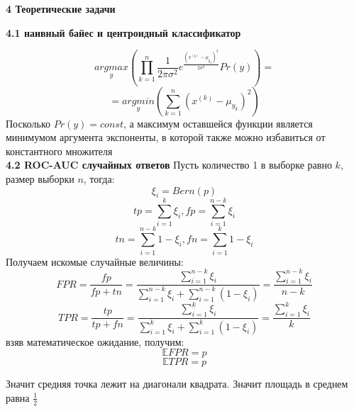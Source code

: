 \documentclass[11pt,a4paper]{article}
\begin{document}
\begin{center}
\Huge {
\noindent
\textbf{4 Теоретические задачи}
}
\end{center}
\Large {
\textbf {4.1 наивный байес и центроидный классификатор}
}

$$ \underset{y}{argmax} (\prod_{k=1}^{n} \frac{1}{2\pi \sigma^2}e^{\frac{(x^{(k)} - \mu_{y_k})^2}{2 \sigma^2}}  Pr(y)) = $$
$$=\underset{y}{argmin} (\sum_{k=1}^{n} (x^{(k)} - \mu_{y_k})^2) $$
Посколько $Pr(y) = const$,
а максимум оставшейся функции является минимумом аргумента экспоненты, в которой также можно избавиться от константного множителя
\\
\Large{
\textbf {4.2 ROC-AUC случайных ответов}
}
Пусть количество 1 в выборке равно $k$, размер выборки $n$, тогда:
\\
$$ \xi_i = Bern(p) $$
$$ tp = \sum_{i=1}^{k} \xi_i,  fp = \sum_{i=1}^{n - k} \xi_i$$
$$ tn = \sum_{i=1}^{n - k} 1- \xi_i,  fn = \sum_{i=1}^{k} 1 - \xi_i$$
Получаем искомые случайные величины:
$$ FPR = \frac{fp}{fp + tn} = \frac{\sum_{i=1}^{n-k} \xi_i}{\sum_{i=1}^{n-k} \xi_i + \sum_{i=1}^{n-k} (1 - \xi_i)} = \frac{\sum_{i=1}^{n-k} \xi_i}{n-k}$$
$$ TPR = \frac{tp}{tp + fn} = \frac{\sum_{i=1}^{k} \xi_i}{\sum_{i=1}^k \xi_i + \sum_{i=1}^{k} (1 - \xi_i)} = \frac{\sum_{i=1}^{k}  \xi_i}{k}$$
взяв математическое ожидание, получим:
$$ \mathbb{E} FPR = p$$
$$ \mathbb{E} TPR = p$$

Значит средняя точка лежит на диагонали квадрата. Значит площадь в среднем равна $\frac{1}{2}$
\end{document}
